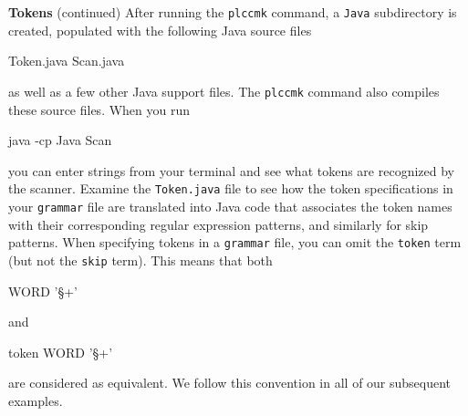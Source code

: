 \begin{minipage}[t]{\sw}
\slidenumber
\Large
{\bf Tokens} (continued)\exx
After running the \verb'plccmk' command,
a \verb'Java' subdirectory is created,
populated with the following Java source files
{\Large
\begin{qv}
Token.java
Scan.java
\end{qv}
}
as well as a few other Java support files.
The \verb'plccmk' command also compiles these source files.
When you run
{\Large
\begin{qv}
java -cp Java Scan
\end{qv}
}
you can enter strings from your terminal
and see what tokens are recognized by the scanner.\exx
Examine the \verb'Token.java' file to see
how the token specifications in your \verb'grammar' file are translated
into Java code that associates
the token names with their corresponding regular expression patterns,
and similarly for skip patterns.\exx
When specifying tokens in a \verb'grammar' file,
you can omit the \verb'token' term (but not the \verb'skip' term).
This means that both
{\Large
\begin{qv}
WORD '\S+'
\end{qv}
}
and
{\Large
\begin{qv}
token WORD '\S+'
\end{qv}
}
are considered as equivalent.
We follow this convention in all of our subsequent examples.\exx
\end{minipage}
\clearpage
